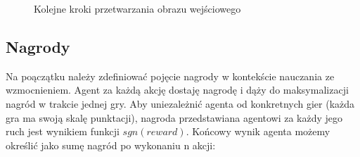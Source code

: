 \documentclass[12pt]{article}
\begin{document}
\begin{figure}[H]%
\centering
{}%
\qquad
{}%
\qquad
{}%
\qquad
{}%
\caption{Kolejne kroki przetwarzania obrazu wejściowego}
\end{figure}


\subsection{Nagrody}

Na poączątku należy zdefiniować pojęcie nagrody w kontekście nauczania ze wzmocnieniem. Agent za każdą akcję dostaję nagrodę i dąży do maksymalizacji nagród w trakcie jednej gry. Aby uniezależnić agenta od konkretnych gier (każda gra ma swoją skalę punktacji), nagroda przedstawiana agentowi za każdy jego ruch jest wynikiem funkcji $sgn(reward)$. Końcowy wynik agenta możemy określić jako sumę nagród po wykonaniu n akcji:
\end{document}

